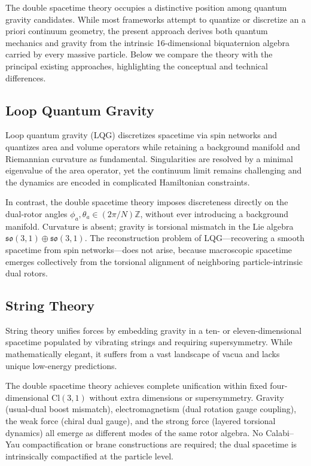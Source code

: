 \documentclass[dvipdfmx,11pt,a4paper]{article}
\begin{document}
The double spacetime theory occupies a distinctive position among quantum gravity candidates. While most frameworks attempt to quantize or discretize an a priori continuum geometry, the present approach derives both quantum mechanics and gravity from the intrinsic 16-dimensional biquaternion algebra carried by every massive particle. Below we compare the theory with the principal existing approaches, highlighting the conceptual and technical differences.

\subsection{Loop Quantum Gravity}

Loop quantum gravity (LQG) discretizes spacetime via spin networks and quantizes area and volume operators while retaining a background manifold and Riemannian curvature as fundamental. Singularities are resolved by a minimal eigenvalue of the area operator, yet the continuum limit remains challenging and the dynamics are encoded in complicated Hamiltonian constraints.

In contrast, the double spacetime theory imposes discreteness directly on the dual-rotor angles $\phi_a, \theta_a \in (2\pi/N)\mathbb{Z}$, without ever introducing a background manifold. Curvature is absent; gravity is torsional mismatch in the Lie algebra $\mathfrak{so}(3,1) \oplus \mathfrak{so}(3,1)$. The reconstruction problem of LQG—recovering a smooth spacetime from spin networks—does not arise, because macroscopic spacetime emerges collectively from the torsional alignment of neighboring particle-intrinsic dual rotors.

\subsection{String Theory}

String theory unifies forces by embedding gravity in a ten- or eleven-dimensional spacetime populated by vibrating strings and requiring supersymmetry. While mathematically elegant, it suffers from a vast landscape of vacua and lacks unique low-energy predictions.

The double spacetime theory achieves complete unification within fixed four-dimensional $\mathrm{Cl}(3,1)$ without extra dimensions or supersymmetry. Gravity (usual-dual boost mismatch), electromagnetism (dual rotation gauge coupling), the weak force (chiral dual gauge), and the strong force (layered torsional dynamics) all emerge as different modes of the same rotor algebra. No Calabi--Yau compactification or brane constructions are required; the dual spacetime is intrinsically compactified at the particle level.
\end{document}
